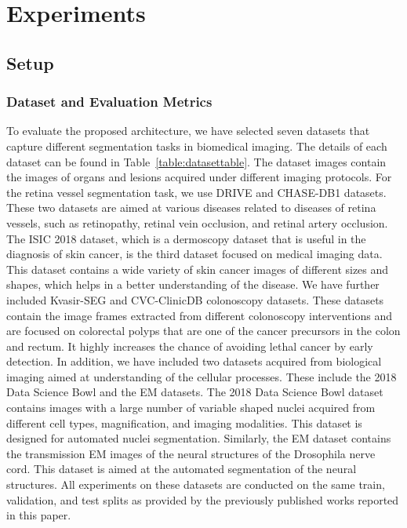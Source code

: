 \documentclass[journal]{IEEEtran}
\begin{document}
\section{Experiments}
\label{experiments}
\subsection{Setup}
\subsubsection{Dataset and Evaluation Metrics}
To evaluate the proposed architecture, we have selected seven datasets that capture different segmentation tasks in biomedical imaging. The details of each dataset can be found in Table~\ref{table:datasettable}. The dataset images contain the images of organs and lesions acquired under different imaging protocols. For the retina vessel segmentation task, we use DRIVE and CHASE-DB1 datasets. These two datasets are aimed at various diseases related to diseases of retina vessels, such as  retinopathy, retinal vein occlusion, and retinal artery occlusion. The ISIC 2018 dataset, which is a dermoscopy dataset that is useful in the diagnosis of skin cancer, is the third dataset focused on medical imaging data. This dataset contains a wide variety of skin cancer images of different sizes and shapes, which helps in a better understanding of the disease. We have further included Kvasir-SEG and CVC-ClinicDB colonoscopy datasets. These datasets contain the image frames extracted from different colonoscopy interventions and are focused on colorectal polyps that are one of the cancer precursors in the colon and rectum. It highly increases the chance of avoiding lethal cancer by early detection. In addition, we have included two datasets acquired from biological imaging aimed at understanding of the cellular processes. These include the 2018 Data Science Bowl and the EM datasets. The 2018 Data Science Bowl dataset contains images with a large number of variable shaped nuclei acquired from different cell types, magnification, and imaging modalities. This dataset is designed for automated nuclei segmentation. Similarly, the EM dataset contains the transmission EM images of the neural structures of the Drosophila nerve cord. This dataset is aimed at the automated segmentation of the neural structures. All experiments on these datasets are conducted on the same train, validation, and test splits as provided by the previously published works reported in this paper.
\end{document}
